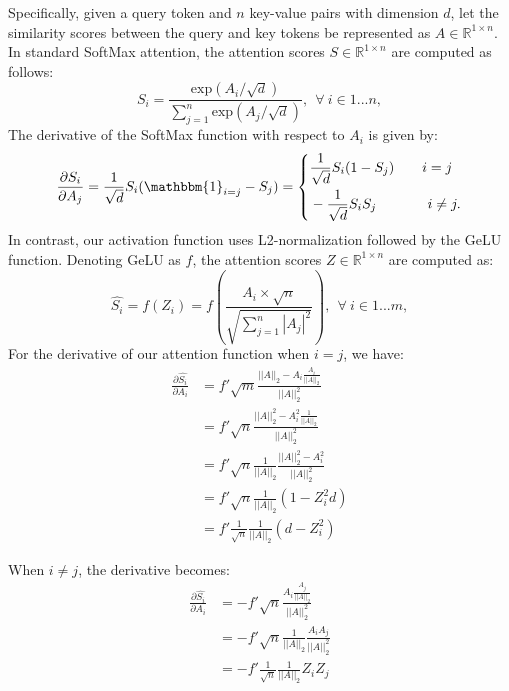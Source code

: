 \documentclass{article} %
\begin{document}
Specifically, given a query token and $n$ key-value pairs with dimension $d$, let the similarity scores between the query and key tokens be represented as $A \in \mathbb{R}^{1\times n}$.
In standard SoftMax attention, the attention scores $S \in \mathbb{R}^{1\times n}$ are computed as follows:
\begin{equation}
    S_i = \frac{\text{exp}(A_i/\sqrt{d})}{\sum_{j=1}^{n} \text{exp}(A_j/\sqrt{d})}, ~~\forall~i \in 1...n,
\end{equation}
The derivative of the SoftMax function with respect to $A_i$ is given by:
\begin{equation}
    \frac{\partial S_i}{\partial A_j} = \frac{1}{\sqrt{d}}S_i (\mathbbm{1}_{i=j} - S_j) = 
        \left\{
            \begin{aligned}
            & \frac{1}{\sqrt{d}}S_i(1-S_j)~~~~~~i=j\\
            & -\frac{1}{\sqrt{d}}S_iS_j~~~~~~~~~~~i \neq j.
            \end{aligned}
        \right.
\label{eq:derivation_softmax}
\end{equation}
In contrast, our activation function uses L2-normalization followed by the GeLU function.
Denoting GeLU as $f$, the attention scores $Z \in \mathbb{R}^{1\times n}$ are computed as:
\begin{equation}
    \hat{S_i} = f(Z_i) = f(\frac{A_i \times \sqrt{n}}{\sqrt{\sum_{j=1}^{n} |A_j|^2}}), ~~\forall~i \in 1...m,
\end{equation}
For the derivative of our attention function when $i = j$, we have:
\begin{align}
\frac{\partial \hat{S_i}}{\partial A_i} &= f' \sqrt{m} \frac{||A||_2 - A_i \frac{A_i}{||A||_2}}{||A||_2^2} \\
  &= f' \sqrt{n} \frac{||A||_2^2  - A_i^2 \frac{1}{||A||_2}}{||A||_2^2} \\
  &= f' \sqrt{n} \frac{1}{||A||_2} \frac{||A||_2^2 - A_i^2}{||A||_2^2} \\
  &= f' \sqrt{n} \frac{1}{||A||_2} (1 - Z_i^2d) \\
  &= f' \frac{1}{\sqrt{n}} \frac{1}{||A||_2} (d - Z_i^2)
\end{align}


When $i \neq j$, the derivative becomes:
\begin{align}
\frac{\partial \hat{S_i}}{\partial A_i} &= - f' \sqrt{n} \frac{A_i \frac{A_j}{||A||_2}}{||A||_2^2} \\
  &= - f' \sqrt{n} \frac{1}{||A||_2} \frac{A_i A_j}{||A||_2^2} \\
  &= - f' \frac{1}{\sqrt{n}} \frac{1}{||A||_2} Z_i Z_j 
\end{align}
\end{document}
